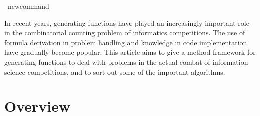\newcommand { \di }{ \ensuremath { \mathrm { \, d}}}
\newcommand { \Mul }{ \ensuremath { \mathsf M}}
\newcommand { \A }{ \ensuremath { \mathbb A}}
\newcommand { \R }{ \ensuremath { \mathsf R}}
\newcommand { \IZ }{ \ensuremath {{I \backslash  \{ 0 \} }}}
\newcommand { \me }{ \mathrm {e}}

\newcommand \DOI [1]{doi: \href {http://doi.org/#1}{ \texttt { #1 }}}
\ newcommand 

\allowdisplaybreaks

\makeatletter
\newenvironment {breakablealgorithm}
  { %
   \begin { center }
     \refstepcounter {algorithm} %
     \hrule height.8pt depth0pt \kern 2pt %
     \renewcommand { \caption }[2][ \relax ]{ %
       { \raggedright \textbf { \ALG@name ~ \thealgorithm } \sc ##2 \par } %
       \ifx \relax ##1 \relax  %
         \addcontentsline {loa}{algorithm}{ \protect\numberline { \thealgorithm }##2} %
       \else  %
         \addcontentsline {loa}{algorithm}{ \protect\numberline { \thealgorithm }##1} %
       \fi
       \kern 2pt \hrule\kern 2pt
     }
  }{ %
     \kern 2pt \hrule\relax %
   \end {center}
  }
\makeatother

\begin { abstract }
In recent years, generating functions have played an increasingly important role in the combinatorial counting problem of informatics competitions. The use of formula derivation in problem handling and knowledge in code implementation have gradually become popular. This article aims to give a method framework for generating functions to deal with problems in the actual combat of information science competitions, and to sort out some of the important algorithms.
\end { abstract }

\ifcont

\tableofcontents

\newpage

\fi

\section { Overview }


